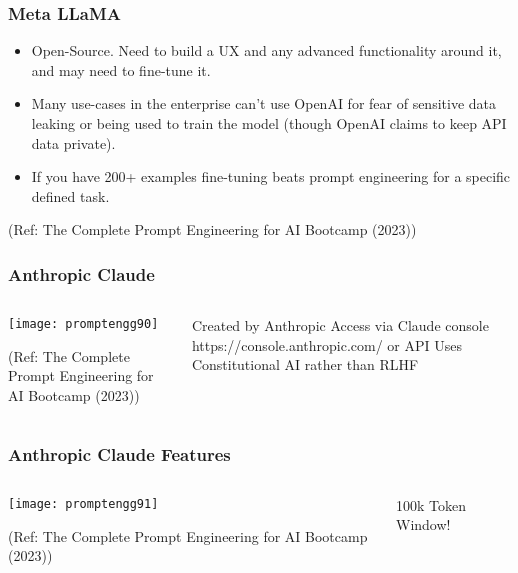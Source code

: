 \begin{frame}[fragile]\frametitle{Meta LLaMA}

\begin{itemize}
\item  Open-Source. Need to build a UX and any advanced functionality around it, and may need to fine-tune it.
\item Many use-cases in the enterprise can’t use OpenAI for fear of sensitive data leaking or being used to train the model (though OpenAI claims to keep API data private).
\item If you have 200+ examples fine-tuning beats prompt engineering for a specific defined task.
\end{itemize}	 

{\tiny (Ref: The Complete Prompt Engineering for AI Bootcamp (2023))}

\end{frame}

\begin{frame}[fragile]\frametitle{Anthropic Claude}


\begin{columns}
    \begin{column}[T]{0.6\linewidth}
		\begin{center}
		\texttt{[image: promptengg90]}

		{\tiny (Ref: The Complete Prompt Engineering for AI Bootcamp (2023))}
		\end{center}	
    \end{column}
    \begin{column}[T]{0.4\linewidth}
		Created by Anthropic 
		Access via Claude console https://console.anthropic.com/ or API
		Uses Constitutional AI rather than RLHF
    \end{column}
  \end{columns}
\end{frame}

\begin{frame}[fragile]\frametitle{Anthropic Claude Features}


\begin{columns}
    \begin{column}[T]{0.6\linewidth}
		\begin{center}
		\texttt{[image: promptengg91]}

		{\tiny (Ref: The Complete Prompt Engineering for AI Bootcamp (2023))}
		\end{center}	
    \end{column}
    \begin{column}[T]{0.4\linewidth}
		100k Token Window! 
    \end{column}
  \end{columns}
\end{frame}

